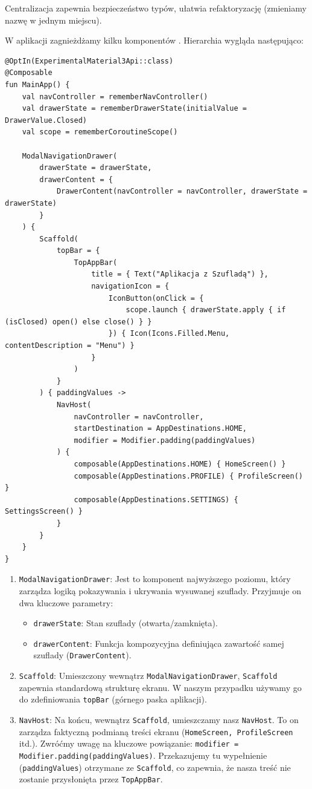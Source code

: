 Centralizacja zapewnia bezpieczeństwo typów, ułatwia refaktoryzację (zmieniamy nazwę w jednym miejscu).

W aplikacji zagnieżdżamy kilku komponentów . Hierarchia wygląda następująco:

\begin{verbatim}
@OptIn(ExperimentalMaterial3Api::class)
@Composable
fun MainApp() {
    val navController = rememberNavController()
    val drawerState = rememberDrawerState(initialValue = DrawerValue.Closed)
    val scope = rememberCoroutineScope()

    ModalNavigationDrawer(
        drawerState = drawerState,
        drawerContent = {
            DrawerContent(navController = navController, drawerState = drawerState)
        }
    ) {
        Scaffold(
            topBar = {
                TopAppBar(
                    title = { Text("Aplikacja z Szufladą") },
                    navigationIcon = {
                        IconButton(onClick = {
                            scope.launch { drawerState.apply { if (isClosed) open() else close() } }
                        }) { Icon(Icons.Filled.Menu, contentDescription = "Menu") }
                    }
                )
            }
        ) { paddingValues ->
            NavHost(
                navController = navController,
                startDestination = AppDestinations.HOME,
                modifier = Modifier.padding(paddingValues)
            ) {
                composable(AppDestinations.HOME) { HomeScreen() }
                composable(AppDestinations.PROFILE) { ProfileScreen() }
                composable(AppDestinations.SETTINGS) { SettingsScreen() }
            }
        }
    }
}
\end{verbatim}

\begin{enumerate}
  \item \texttt{ModalNavigationDrawer}: Jest to komponent najwyższego poziomu, który zarządza logiką pokazywania i ukrywania wysuwanej szuflady. Przyjmuje on dwa kluczowe parametry:
  \begin{itemize}
    \item \texttt{drawerState}: Stan szuflady (otwarta/zamknięta).
    \item \texttt{drawerContent}: Funkcja kompozycyjna definiująca zawartość samej szuflady (\texttt{DrawerContent}).
  \end{itemize}
  \item \texttt{Scaffold}: Umieszczony wewnątrz \texttt{ModalNavigationDrawer}, \texttt{Scaffold} zapewnia standardową strukturę ekranu. W naszym przypadku używamy go do zdefiniowania \texttt{topBar} (górnego paska aplikacji).

  \item \texttt{NavHost}: Na końcu, wewnątrz \texttt{Scaffold}, umieszczamy nasz \texttt{NavHost}. To on zarządza faktyczną podmianą treści ekranu (\texttt{HomeScreen, ProfileScreen} itd.). Zwróćmy uwagę na kluczowe powiązanie: \texttt{modifier = Modifier.padding(paddingValues)}. Przekazujemy tu wypełnienie (\texttt{paddingValues}) otrzymane ze \texttt{Scaffold}, co zapewnia, że nasza treść nie zostanie przysłonięta przez \texttt{TopAppBar}.
\end{enumerate}


